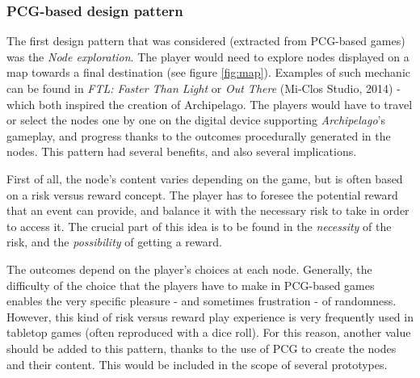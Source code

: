\subsubsection{PCG-based design pattern}
The first design pattern that was considered (extracted from PCG-based games) was the \textit{Node exploration}. The player would need to explore nodes displayed on a map towards a final destination (see figure \ref{fig:map}). Examples of such mechanic can be found in \textit{FTL: Faster Than Light} \cite{game:ftl} or \textit{Out There} (Mi-Clos Studio, 2014)\cite{game:outthere} - which both inspired the creation of Archipelago. The players would have to travel or select the nodes one by one on the digital device supporting  \textit{Archipelago}'s gameplay, and progress thanks to the outcomes procedurally generated in the nodes. This pattern had several benefits, and also several implications. 

First of all, the node's content varies depending on the game, but is often based on a risk versus reward concept. The player has to foresee the potential reward that an event can provide, and balance it with the necessary risk to take in order to access it. The crucial part of this idea is to be found in the \textit{necessity} of the risk, and the \textit{possibility} of getting a reward. 

The outcomes depend on the player's choices at each node. Generally, the difficulty of the choice that the players have to make in PCG-based games enables the very specific pleasure - and sometimes frustration - of randomness. However, this kind of risk versus reward play experience is very frequently used in tabletop games (often reproduced with a dice roll). For this reason, another value should be added to this pattern, thanks to the use of PCG to create the nodes and their content. This would be included in the scope of several prototypes.

